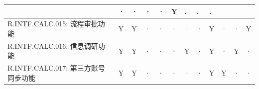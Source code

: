 \begin{table}[htbp]
\begin{tabular}{|p{9em}|p{2em}|p{2em}|p{2em}|p{2em}|p{2em}|
                            p{2em}|p{2em}|p{2em}|p{2em}|p{2em}|p{2em}|}
                & ·                     & ·                 & · 
                & ·                     & Y                 & .
                & .                     & . \\
            \hline %
            {\color{red}R.INTF.CALC.015: 流程审批功能}
                & {\color{red}Y}        & {\color{red}Y}    & {\color{red}·}
                & {\color{red}·}        & {\color{red}·}    & {\color{red}·}
                & {\color{red}·}        & {\color{red}Y}    & {\color{red}·}
                & {\color{red}·}        & {\color{red}Y} \\
            \hline %
            {\color{red}R.INTF.CALC.016: 信息调研功能}
                & {\color{red}Y}        & {\color{red}Y}    & {\color{red}·}
                & {\color{red}·}        & {\color{red}·}    & {\color{red}Y}
                & {\color{red}·}        & {\color{red}Y}    & {\color{red}·}
                & {\color{red}Y}        & {\color{red}·}\\
            \hline %
            {\color{red}R.INTF.CALC.017: 第三方账号同步功能}
                & {\color{red}Y}        & {\color{red}Y}    & {\color{red}·}
                & {\color{red}·}        & {\color{red}·}    & {\color{red}·}
                & {\color{red}·}        & {\color{red}Y}    & {\color{red}Y}
                & {\color{red}·}        & {\color{red}·}\\
            \hline %
            \end{tabular}
    \end{table}
